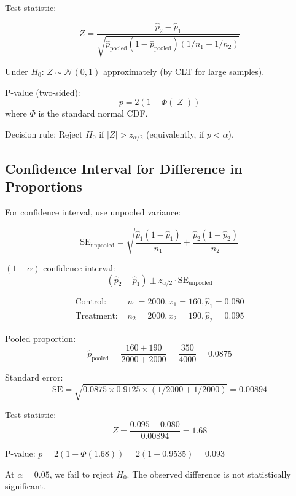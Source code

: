 Test statistic:

\begin{equation}
Z = \frac{\hat{p}_2 - \hat{p}_1}{\sqrt{\hat{p}_{\text{pooled}}(1 - \hat{p}_{\text{pooled}})(1/n_1 + 1/n_2)}}
\end{equation}

Under $H_0$: $Z \sim \mathcal{N}(0, 1)$ approximately (by CLT for large samples).

P-value (two-sided):
\begin{equation}
p = 2(1 - \Phi(|Z|))
\end{equation}
where $\Phi$ is the standard normal CDF.

Decision rule: Reject $H_0$ if $|Z| > z_{\alpha/2}$ (equivalently, if $p < \alpha$).

\subsection{Confidence Interval for Difference in Proportions}

For confidence interval, use unpooled variance:

\begin{equation}
\text{SE}_{\text{unpooled}} = \sqrt{\frac{\hat{p}_1(1-\hat{p}_1)}{n_1} + \frac{\hat{p}_2(1-\hat{p}_2)}{n_2}}
\end{equation}

$(1-\alpha)$ confidence interval:
\begin{equation}
(\hat{p}_2 - \hat{p}_1) \pm z_{\alpha/2} \cdot \text{SE}_{\text{unpooled}}
\end{equation}

\begin{example}
\begin{align*}
\text{Control: } & n_1 = 2000, x_1 = 160, \hat{p}_1 = 0.080 \\
\text{Treatment: } & n_2 = 2000, x_2 = 190, \hat{p}_2 = 0.095
\end{align*}

Pooled proportion:
\begin{equation}
\hat{p}_{\text{pooled}} = \frac{160 + 190}{2000 + 2000} = \frac{350}{4000} = 0.0875
\end{equation}

Standard error:
\begin{equation}
\text{SE} = \sqrt{0.0875 \times 0.9125 \times (1/2000 + 1/2000)} = 0.00894
\end{equation}

Test statistic:
\begin{equation}
Z = \frac{0.095 - 0.080}{0.00894} = 1.68
\end{equation}

P-value: $p = 2(1 - \Phi(1.68)) = 2(1 - 0.9535) = 0.093$

At $\alpha = 0.05$, we fail to reject $H_0$. The observed difference is not statistically significant.
\end{example}

